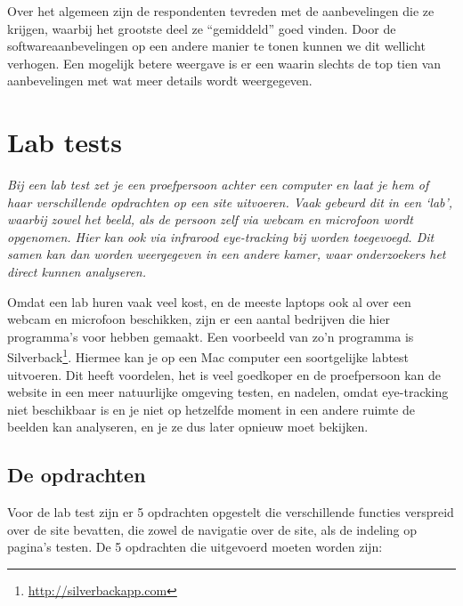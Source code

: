 \documentclass[a4paper, 10pt, pdftex]{report}
\begin{document}
    Over het algemeen zijn de respondenten tevreden met de aanbevelingen die ze krijgen, waarbij het grootste deel ze ``gemiddeld'' goed vinden. Door de softwareaanbevelingen op een andere manier te tonen kunnen we dit wellicht verhogen. Een mogelijk betere weergave is er een waarin slechts de top tien van aanbevelingen met wat meer details wordt weergegeven.

    \newpage
    \section{Lab tests}
    \textit{Bij een lab test zet je een proefpersoon achter een computer en laat je hem of haar verschillende opdrachten op een site uitvoeren. Vaak gebeurd dit in een `lab', waarbij zowel het beeld, als de persoon zelf via webcam en microfoon wordt opgenomen. Hier kan ook via infrarood eye-tracking bij worden toegevoegd. Dit samen kan dan worden weergegeven in een andere kamer, waar onderzoekers het direct kunnen analyseren.}

    Omdat een lab huren vaak veel kost, en de meeste laptops ook al over een webcam en microfoon beschikken, zijn er een aantal bedrijven die hier programma's voor hebben gemaakt. Een voorbeeld van zo'n programma is Silverback\footnote{\url{http://silverbackapp.com}}. Hiermee kan je op een Mac computer een soortgelijke labtest uitvoeren. Dit heeft voordelen, het is veel goedkoper en de proefpersoon kan de website in een meer natuurlijke omgeving testen, en nadelen, omdat eye-tracking niet beschikbaar is en je niet op hetzelfde moment in een andere ruimte de beelden kan analyseren, en je ze dus later opnieuw moet bekijken.

    \subsection{De opdrachten}
    Voor de lab test zijn er 5 opdrachten opgestelt die verschillende functies verspreid over de site bevatten, die zowel de navigatie over de site, als de indeling op pagina's testen. De 5 opdrachten die uitgevoerd moeten worden zijn:
\end{document}
